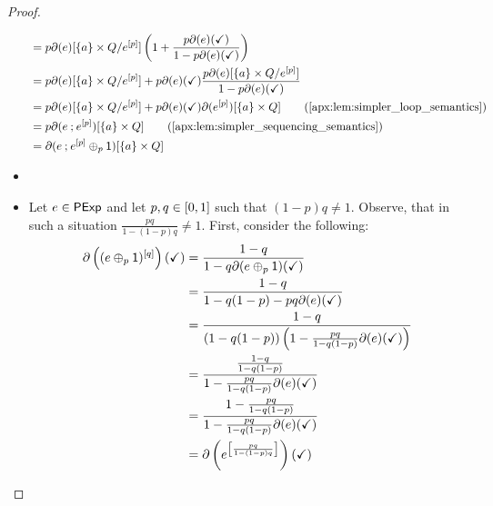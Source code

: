 \begin{proof}
\begin{itemize}
\begin{align*}
            &= p \partial(e)[\{a\} \times Q/{e^{[p]}}] \left( 1 + \frac{p\partial(e)(\checkmark)}{1-p\partial(e)(\checkmark)}\right)\\
            &= p \partial(e)[\{a\} \times Q/{e^{[p]}}] + p\partial(e)(\checkmark)\frac{p\partial(e)[\{a\} \times {Q}/{e^{[p]}}]}{1-p\partial(e)(\checkmark)}\\
            &= p \partial(e)[\{a\} \times Q/{e^{[p]}}] + p\partial(e)(\checkmark)\partial(e^{[p]})[\{a\} \times Q] \tag{\Cref{apx:lem:simpler_loop_semantics}}\\
            &= p \partial(e \seq e^{[p]})[\{a\} \times Q]\tag{\Cref{apx:lem:simpler_sequencing_semantics}}\\
            &=\partial(e \seq e^{[p]} \oplus_p \one)[\{a\} \times Q]
        \end{align*}

        \item[] 
        \item[] Let $e \in \mathsf{PExp}$ and let $p,q \in \interval{0}{1}$ such that $(1-p)q \neq 1$. Observe, that in such a situation $\frac{pq}{1-(1-p)q}\neq 1$.
        First, consider the following:
        \begin{align*}
            \partial\left((e \oplus_p \mathsf{1})^{[q]}\right)(\checkmark) &= \frac{1-q}{1-q\partial(e \oplus_p \mathsf{1})(\checkmark)} \\
            &= \frac{1-q}{1-q(1-p)-pq\partial(e)(\checkmark)} \\
            &= \frac{1-q}{(1-q(1-p))\left(1-\frac{pq}{1-q(1-p)}\partial(e)(\checkmark)\right)}\\
            &=\frac{\frac{1-q}{1-q(1-p)}}{1-\frac{pq}{1-q(1-p)}\partial(e)(\checkmark)}\\
            &=\frac{1-\frac{pq}{1-q(1-p)}}{1-\frac{pq}{1-q(1-p)}\partial(e)(\checkmark)}\\
            &=\partial \left(e^{\left[\frac{pq}{1-(1-p)q}\right]}\right)(\checkmark)
        \end{align*}


\end{itemize}
\end{proof}
